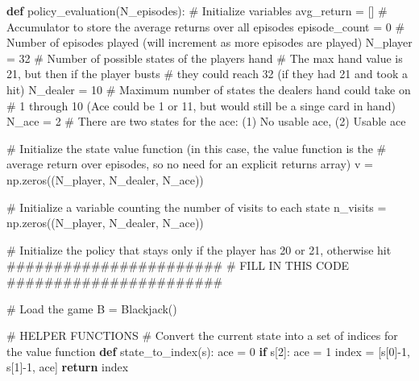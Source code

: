 \documentclass[
  letterpaper,
  DIV=11,
  numbers=noendperiod]{scrartcl}
\newenvironment{Shaded}{\begin{snugshade}}{\end{snugshade}}
\newcommand{\CommentTok}[1]{\textcolor[rgb]{0.37,0.37,0.37}{#1}}
\newcommand{\ControlFlowTok}[1]{\textcolor[rgb]{0.00,0.23,0.31}{\textbf{#1}}}
\newcommand{\DecValTok}[1]{\textcolor[rgb]{0.68,0.00,0.00}{#1}}
\newcommand{\KeywordTok}[1]{\textcolor[rgb]{0.00,0.23,0.31}{\textbf{#1}}}
\newcommand{\NormalTok}[1]{\textcolor[rgb]{0.00,0.23,0.31}{#1}}
\newcommand{\OperatorTok}[1]{\textcolor[rgb]{0.37,0.37,0.37}{#1}}
\begin{document}
\begin{Shaded}
\begin{Highlighting}[]
\KeywordTok{def}\NormalTok{ policy\_evaluation(N\_episodes):}
    \CommentTok{\# Initialize variables}
\NormalTok{    avg\_return }\OperatorTok{=}\NormalTok{ []    }\CommentTok{\# Accumulator to store the average returns over all episodes}
\NormalTok{    episode\_count }\OperatorTok{=} \DecValTok{0}  \CommentTok{\# Number of episodes played (will increment as more episodes are played)}
\NormalTok{    N\_player   }\OperatorTok{=} \DecValTok{32}    \CommentTok{\# Number of possible states of the players hand}
                       \CommentTok{\#  The max hand value is 21, but then if the player busts }
                       \CommentTok{\#  they could reach 32 (if they had 21 and took a hit)}
\NormalTok{    N\_dealer   }\OperatorTok{=} \DecValTok{10}    \CommentTok{\# Maximum number of states the dealer\textquotesingle{}s hand could take on}
                       \CommentTok{\#  1 through 10 (Ace could be 1 or 11, but would still be a singe card in hand)}
\NormalTok{    N\_ace      }\OperatorTok{=} \DecValTok{2}     \CommentTok{\# There are two states for the ace: (1) No usable ace, (2) Usable ace}
    
    \CommentTok{\# Initialize the state value function (in this case, the value function is the }
    \CommentTok{\#   average return over episodes, so no need for an explicit returns array)}
\NormalTok{    v }\OperatorTok{=}\NormalTok{ np.zeros((N\_player, N\_dealer, N\_ace)) }
    
    \CommentTok{\# Initialize a variable counting the number of visits to each state}
\NormalTok{    n\_visits }\OperatorTok{=}\NormalTok{ np.zeros((N\_player, N\_dealer, N\_ace))}
    
    \CommentTok{\# Initialize the policy that stays only if the player has 20 or 21, otherwise hit}
    \CommentTok{\#\#\#\#\#\#\#\#\#\#\#\#\#\#\#\#\#\#\#\#\#\#\#}
    \CommentTok{\# FILL IN THIS CODE}
    \CommentTok{\#\#\#\#\#\#\#\#\#\#\#\#\#\#\#\#\#\#\#\#\#\#\#}
    
    \CommentTok{\# Load the game}
\NormalTok{    B }\OperatorTok{=}\NormalTok{ Blackjack()}
    
    \CommentTok{\# HELPER FUNCTIONS}
    \CommentTok{\# Convert the current state into a set of indices for the value function}
    \KeywordTok{def}\NormalTok{ state\_to\_index(s):}
\NormalTok{        ace }\OperatorTok{=} \DecValTok{0}
        \ControlFlowTok{if}\NormalTok{ s[}\DecValTok{2}\NormalTok{]:}
\NormalTok{            ace }\OperatorTok{=} \DecValTok{1}
\NormalTok{        index }\OperatorTok{=}\NormalTok{ [s[}\DecValTok{0}\NormalTok{]}\OperatorTok{{-}}\DecValTok{1}\NormalTok{, s[}\DecValTok{1}\NormalTok{]}\OperatorTok{{-}}\DecValTok{1}\NormalTok{, ace]}
        \ControlFlowTok{return}\NormalTok{ index}
    

\end{Highlighting}
\end{Shaded}
\end{document}

